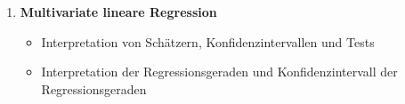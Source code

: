 \documentclass[a4paper,fontsize=13pt]{scrartcl}
\begin{document}
\begin{enumerate}
   \item{\textbf{Multivariate lineare Regression}
     \begin{itemize}
          \item{Interpretation von Schätzern, Konfidenzintervallen und Tests}
          \item{Interpretation der Regressionsgeraden und Konfidenzintervall der Regressionsgeraden}
     \end{itemize}
   }
  
  
\end{enumerate}



\end{document}
